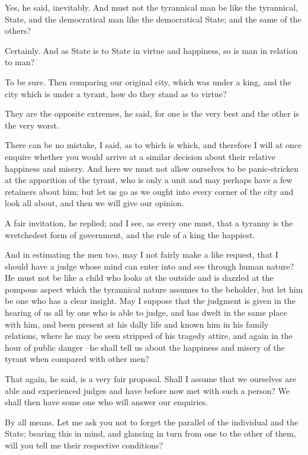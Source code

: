 Yes, he said, inevitably.
And must not the tyrannical man be like the tyrannical, State, and the democratical man like the democratical State; and the same of the others?

Certainly.
And as State is to State in virtue and happiness, so is man in relation to man?

To be sure.
Then comparing our original city, which was under a king, and the city which is under a tyrant, how do they stand as to virtue?

They are the opposite extremes, he said, for one is the very best and the other is the very worst.

There can be no mistake, I said, as to which is which, and therefore I will at once enquire whether you would arrive at a similar decision about their relative happiness and misery. And here we must not allow ourselves to be panic-stricken at the apparition of the tyrant, who is only a unit and may perhaps have a few retainers about him; but let us go as we ought into every corner of the city and look all about, and then we will give our opinion.

A fair invitation, he replied; and I see, as every one must, that a tyranny is the wretchedest form of government, and the rule of a king the happiest.

And in estimating the men too, may I not fairly make a like request, that I should have a judge whose mind can enter into and see through human nature? He must not be like a child who looks at the outside and is dazzled at the pompous aspect which the tyrannical nature assumes to the beholder, but let him be one who has a clear insight. May I suppose that the judgment is given in the hearing of us all by one who is able to judge, and has dwelt in the same place with him, and been present at his dally life and known him in his family relations, where he may be seen stripped of his tragedy attire, and again in the hour of public danger --he shall tell us about the happiness and misery of the tyrant when compared with other men?

That again, he said, is a very fair proposal.
Shall I assume that we ourselves are able and experienced judges and have before now met with such a person? We shall then have some one who will answer our enquiries.

By all means.
Let me ask you not to forget the parallel of the individual and the State; bearing this in mind, and glancing in turn from one to the other of them, will you tell me their respective conditions?

